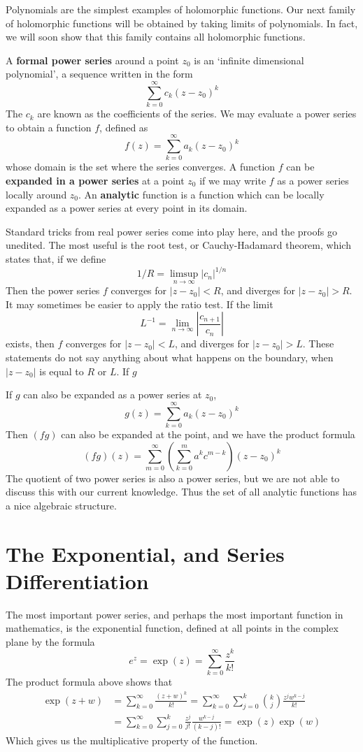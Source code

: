 Polynomials are the simplest examples of holomorphic functions. Our next family of holomorphic functions will be obtained by taking limits of polynomials. In fact, we will soon show that this family contains all holomorphic functions.

\begin{definition}
    A {\bf formal power series} around a point $z_0$ is an `infinite dimensional polynomial', a sequence written in the form
    \[ \sum_{k = 0}^\infty c_k (z - z_0)^k \]
    The $c_k$ are known as the coefficients of the series. We may evaluate a power series to obtain a function $f$, defined as
    \[ f(z) = \sum_{k = 0}^\infty a_k (z - z_0)^k \]
    whose domain is the set where the series converges. A function $f$ can be {\bf expanded in a power series} at a point $z_0$ if we may write $f$ as a power series locally around $z_0$. An {\bf analytic} function is a function which can be locally expanded as a power series at every point in its domain.
\end{definition}

Standard tricks from real power series come into play here, and the proofs go unedited. The most useful is the root test, or Cauchy-Hadamard theorem, which states that, if we define
%
\[ 1/R = \limsup_{n \to \infty} |c_n|^{1/n} \]
%
Then the power series $f$ converges for $|z - z_0| < R$, and diverges for $|z - z_0| > R$. It may sometimes be easier to apply the ratio test. If the limit
%
\[ L^{-1} = \lim_{n \to \infty} \left| \frac{c_{n+1}}{c_n} \right| \]
%
exists, then $f$ converges for $|z - z_0| < L$, and diverges for $|z - z_0| > L$. These statements do not say anything about what happens on the boundary, when $|z - z_0|$ is equal to $R$ or $L$. If $g$ 

If $g$ can also be expanded as a power series at $z_0$,
%
\[ g(z) = \sum_{k = 0}^\infty a_k (z - z_0)^k \]
%
Then $(fg)$ can also be expanded at the point, and we have the product formula
%
\[ (fg)(z) = \sum_{m = 0}^\infty \left( \sum_{k = 0}^m a^kc^{m-k} \right) (z - z_0)^k \]
%
The quotient of two power series is also a power series, but we are not able to discuss this with our current knowledge. Thus the set of all analytic functions has a nice algebraic structure.

\section{The Exponential, and Series Differentiation}

The most important power series, and perhaps the most important function in mathematics, is the exponential function, defined at all points in the complex plane by the formula
%
\[ e^z = \exp(z) = \sum_{k = 0}^\infty \frac{z^k}{k!} \]
%
The product formula above shows that
%
\begin{align*}
    \exp(z + w) &= \sum_{k = 0}^\infty \frac{(z + w)^k}{k!} = \sum_{k = 0}^\infty \sum_{j = 0}^k \binom{k}{j} \frac{z^j w^{k-j}}{k!}\\
    &= \sum_{k = 0}^\infty \sum_{j = 0}^k \frac{z^j}{j!} \frac{w^{k-j}}{(k - j)!} = \exp(z) \exp(w)
\end{align*}
%
Which gives us the multiplicative property of the function.

